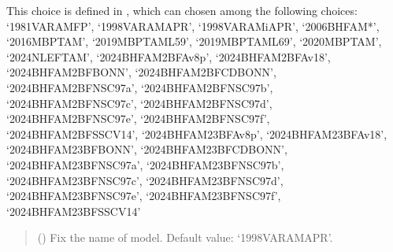 \documentclass[letterpaper,10pt,english]{sphinxmanual}
\begin{document}
\begin{fulllineitems}
\sphinxAtStartPar
This choice is defined in , which can chosen among     the following choices:     ‘1981\sphinxhyphen{}VAR\sphinxhyphen{}AM\sphinxhyphen{}FP’, ‘1998\sphinxhyphen{}VAR\sphinxhyphen{}AM\sphinxhyphen{}APR’, ‘1998\sphinxhyphen{}VAR\sphinxhyphen{}AM\sphinxhyphen{}iAPR’, ‘2006\sphinxhyphen{}BHF\sphinxhyphen{}AM*’,     ‘2016\sphinxhyphen{}MBPT\sphinxhyphen{}AM’, ‘2019\sphinxhyphen{}MBPT\sphinxhyphen{}AM\sphinxhyphen{}L59’, ‘2019\sphinxhyphen{}MBPT\sphinxhyphen{}AM\sphinxhyphen{}L69’,     ‘2020\sphinxhyphen{}MBPT\sphinxhyphen{}AM’, ‘2024\sphinxhyphen{}NLEFT\sphinxhyphen{}AM’,     ‘2024\sphinxhyphen{}BHF\sphinxhyphen{}AM\sphinxhyphen{}2BF\sphinxhyphen{}Av8p’, ‘2024\sphinxhyphen{}BHF\sphinxhyphen{}AM\sphinxhyphen{}2BF\sphinxhyphen{}Av18’, ‘2024\sphinxhyphen{}BHF\sphinxhyphen{}AM\sphinxhyphen{}2BF\sphinxhyphen{}BONN’, ‘2024\sphinxhyphen{}BHF\sphinxhyphen{}AM\sphinxhyphen{}2BF\sphinxhyphen{}CDBONN’,     ‘2024\sphinxhyphen{}BHF\sphinxhyphen{}AM\sphinxhyphen{}2BF\sphinxhyphen{}NSC97a’, ‘2024\sphinxhyphen{}BHF\sphinxhyphen{}AM\sphinxhyphen{}2BF\sphinxhyphen{}NSC97b’, ‘2024\sphinxhyphen{}BHF\sphinxhyphen{}AM\sphinxhyphen{}2BF\sphinxhyphen{}NSC97c’, ‘2024\sphinxhyphen{}BHF\sphinxhyphen{}AM\sphinxhyphen{}2BF\sphinxhyphen{}NSC97d’,     ‘2024\sphinxhyphen{}BHF\sphinxhyphen{}AM\sphinxhyphen{}2BF\sphinxhyphen{}NSC97e’, ‘2024\sphinxhyphen{}BHF\sphinxhyphen{}AM\sphinxhyphen{}2BF\sphinxhyphen{}NSC97f’, ‘2024\sphinxhyphen{}BHF\sphinxhyphen{}AM\sphinxhyphen{}2BF\sphinxhyphen{}SSCV14’,     ‘2024\sphinxhyphen{}BHF\sphinxhyphen{}AM\sphinxhyphen{}23BF\sphinxhyphen{}Av8p’, ‘2024\sphinxhyphen{}BHF\sphinxhyphen{}AM\sphinxhyphen{}23BF\sphinxhyphen{}Av18’, ‘2024\sphinxhyphen{}BHF\sphinxhyphen{}AM\sphinxhyphen{}23BF\sphinxhyphen{}BONN’, ‘2024\sphinxhyphen{}BHF\sphinxhyphen{}AM\sphinxhyphen{}23BF\sphinxhyphen{}CDBONN’,     ‘2024\sphinxhyphen{}BHF\sphinxhyphen{}AM\sphinxhyphen{}23BF\sphinxhyphen{}NSC97a’, ‘2024\sphinxhyphen{}BHF\sphinxhyphen{}AM\sphinxhyphen{}23BF\sphinxhyphen{}NSC97b’, ‘2024\sphinxhyphen{}BHF\sphinxhyphen{}AM\sphinxhyphen{}23BF\sphinxhyphen{}NSC97c’, ‘2024\sphinxhyphen{}BHF\sphinxhyphen{}AM\sphinxhyphen{}23BF\sphinxhyphen{}NSC97d’,     ‘2024\sphinxhyphen{}BHF\sphinxhyphen{}AM\sphinxhyphen{}23BF\sphinxhyphen{}NSC97e’, ‘2024\sphinxhyphen{}BHF\sphinxhyphen{}AM\sphinxhyphen{}23BF\sphinxhyphen{}NSC97f’, ‘2024\sphinxhyphen{}BHF\sphinxhyphen{}AM\sphinxhyphen{}23BF\sphinxhyphen{}SSCV14’
\begin{quote}\begin{description}
\sphinxAtStartPar
{} (\sphinxstyleliteralemphasis{\sphinxupquote{, }}) \textendash{} Fix the name of model. Default value: ‘1998\sphinxhyphen{}VAR\sphinxhyphen{}AM\sphinxhyphen{}APR’.


\end{description}
\end{quote}
\end{fulllineitems}
\end{document}
